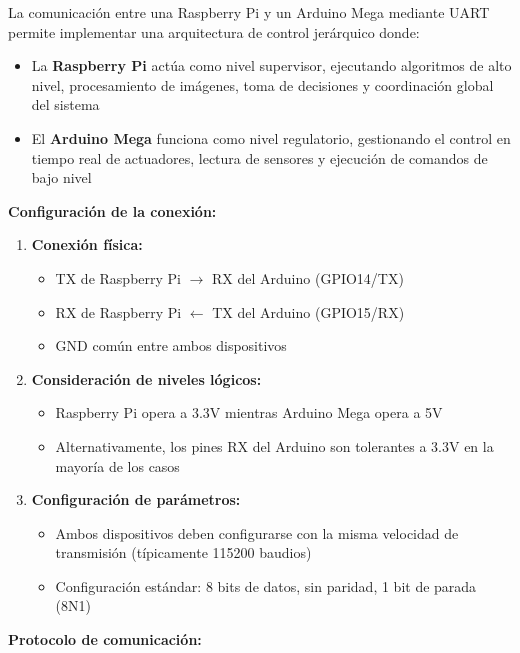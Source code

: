 La comunicación entre una Raspberry Pi y un Arduino Mega mediante UART permite implementar una arquitectura de control jerárquico donde:

\begin{itemize}
    \item La \textbf{Raspberry Pi} actúa como nivel supervisor, ejecutando algoritmos de alto nivel, procesamiento de imágenes, toma de decisiones y coordinación global del sistema
    \item El \textbf{Arduino Mega} funciona como nivel regulatorio, gestionando el control en tiempo real de actuadores, lectura de sensores y ejecución de comandos de bajo nivel
\end{itemize}

\textbf{Configuración de la conexión:}

\begin{enumerate}
    \item \textbf{Conexión física:}
    \begin{itemize}
        \item TX de Raspberry Pi $\rightarrow$ RX del Arduino (GPIO14/TX)
        \item RX de Raspberry Pi $\leftarrow$ TX del Arduino (GPIO15/RX)
        \item GND común entre ambos dispositivos
    \end{itemize}

    \item \textbf{Consideración de niveles lógicos:}
    \begin{itemize}
        \item Raspberry Pi opera a 3.3V mientras Arduino Mega opera a 5V
        \item Alternativamente, los pines RX del Arduino son tolerantes a 3.3V en la mayoría de los casos
    \end{itemize}

    \item \textbf{Configuración de parámetros:}
    \begin{itemize}
        \item Ambos dispositivos deben configurarse con la misma velocidad de transmisión (típicamente 115200 baudios)
        \item Configuración estándar: 8 bits de datos, sin paridad, 1 bit de parada (8N1)
    \end{itemize}
\end{enumerate}

\textbf{Protocolo de comunicación:}

